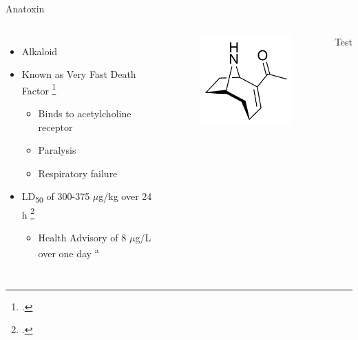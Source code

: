 \begin{frame}{Anatoxin}
\begin{columns}
	\begin{itemize}
		\item Alkaloid 
		\item Known as Very Fast Death Factor \footcite{codd_cyanobacterial_1999} 
			\begin{itemize}
				\item Binds to acetylcholine receptor
				\item Paralysis 
				\item Respiratory failure
			\end{itemize}
		\item LD\textsubscript{50} of 300-375 $\mu$g/kg over 24 h \footcite{shaw_cylindrospermopsin_2000}
			\begin{itemize}
				\item Health Advisory of 8 $\mu$g/L over one day \textsuperscript{a} 
			\end{itemize}
	\end{itemize}
	\begin{figure}
		\hspace*{-10cm}
		\centering
		\includegraphics[width=2in]{anatoxin.png}
	\end{figure}
	\hspace*{-3cm}
	\footnotesize{Test}
\end{columns}

\end{frame}
